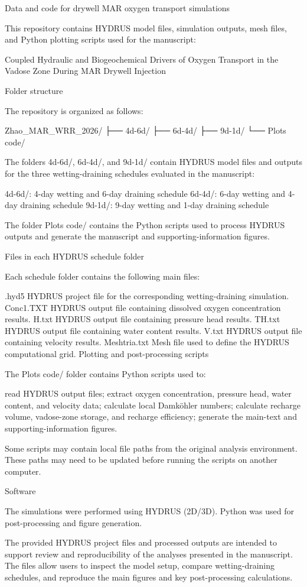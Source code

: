 Data and code for drywell MAR oxygen transport simulations

This repository contains HYDRUS model files, simulation outputs, mesh files, and Python plotting scripts used for the manuscript:

Coupled Hydraulic and Biogeochemical Drivers of Oxygen Transport in the Vadose Zone During MAR Drywell Injection

Folder structure

The repository is organized as follows:

Zhao_MAR_WRR_2026/
├── 4d-6d/
├── 6d-4d/
├── 9d-1d/
└── Plots code/

The folders 4d-6d/, 6d-4d/, and 9d-1d/ contain HYDRUS model files and outputs for the three wetting-draining schedules evaluated in the manuscript:

4d-6d/: 4-day wetting and 6-day draining schedule
6d-4d/: 6-day wetting and 4-day draining schedule
9d-1d/: 9-day wetting and 1-day draining schedule

The folder Plots code/ contains the Python scripts used to process HYDRUS outputs and generate the manuscript and supporting-information figures.

Files in each HYDRUS schedule folder

Each schedule folder contains the following main files:

.hyd5
HYDRUS project file for the corresponding wetting-draining simulation.
Conc1.TXT
HYDRUS output file containing dissolved oxygen concentration results.
H.txt
HYDRUS output file containing pressure head results.
TH.txt
HYDRUS output file containing water content results.
V.txt
HYDRUS output file containing velocity results.
Meshtria.txt
Mesh file used to define the HYDRUS computational grid.
Plotting and post-processing scripts

The Plots code/ folder contains Python scripts used to:

read HYDRUS output files;
extract oxygen concentration, pressure head, water content, and velocity data;
calculate local Damköhler numbers;
calculate recharge volume, vadose-zone storage, and recharge efficiency;
generate the main-text and supporting-information figures.

Some scripts may contain local file paths from the original analysis environment. These paths may need to be updated before running the scripts on another computer.

Software

The simulations were performed using HYDRUS (2D/3D). Python was used for post-processing and figure generation.

The provided HYDRUS project files and processed outputs are intended to support review and reproducibility of the analyses presented in the manuscript. The files allow users to inspect the model setup, compare wetting-draining schedules, and reproduce the main figures and key post-processing calculations.